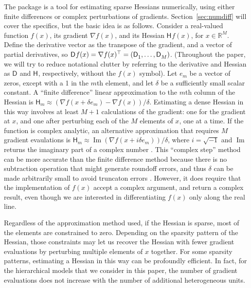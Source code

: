 \documentclass[jss]{jss}\usepackage[]{graphicx}\usepackage[]{color}
\newcommand{\parD}[3]{\mathsf{D}^{#1}_{#2}#3}
\newcommand{\hess}[2]{\mathsf{H}_{#1}#2}
\DeclareMathOperator{\Imag}{Im}
\begin{document}
The  package is a tool for estimating
sparse Hessians numerically, using either finite differences or
complex perturbations of
gradients.  Section~\ref{sec:numdiff} will
cover the specifics, but the basic idea is as follows.  Consider a real-valued
function $f(x)$, its gradient $\nabla{f(x)}$, and its Hessian
$\hess{}{f(x)}$, for $x\in\mathbb{R}^M$.  Define the derivative vector
as the transpose of the gradient, and a vector of partial derivatives, so
${\parD{}{}{f(x)}=\nabla f(x)^\top=\left(\parD{}{1}{},\mathellipsis,\parD{}{M}{}\right)}$.   (Throughout the paper, we will try
to reduce notational clutter by referring to the derivative and
Hessian as $\parD{}{}{}$ and $\hess{}{}$, respectively, without the
$f(x)$ symbol).  Let $e_m$ be a vector of zeros, except with a 1 in the $m$th
element, and let $\delta$ be a sufficiently small scalar
constant. A ``finite difference'' linear approximation to the $m$th column of the Hessian is ${\hess{m}{}\approx\left(\nabla f(x+\delta
  e_m)- \nabla f(x)\right)/\delta}$.  Estimating a dense Hessian in this way involves at least $M+1$ calculations of the
gradient: one for the gradient at $x$, and one after perturbing each
of the $M$ elements of $x$, one at a time. If the function is complex
analytic, an alternative approximation that requires $M$ gradient
evaulations is $\hess{m}{}\approx\Imag\left(\nabla f(x+i\delta
  e_m)\right)/\delta$, where $i=\sqrt{-1}$ and $\Imag$ returns the imaginary part of a complex
number \citep{SquireTrapp1998}. This ``complex step'' method can be more accurate than the
finite difference method because there is no subtraction operation
that might generate roundoff errors, and thus $\delta$ can be made
arbitrarily small to avoid truncaton errors \citep{LaiCrassidis2008}. However, it does require that the
implementation of $f(x)$ accept a complex argument, and return a
complex result, even though we are interested in differentiating $f(x)$ only along
the real line.

Regardless of the approximation method used, if the Hessian is sparse, most of the
elements are constrained to zero.  Depending
on the sparsity pattern of the Hessian, those constraints may let us recover
the Hessian with fewer gradient evaluations by perturbing multiple
elements of $x$ together.  For some sparsity patterns, estimating a Hessian in
this way can be profoundly efficient.  In fact, for the hierarchical models that we consider in
this paper, the number of gradient evaluations does not increase with
the number of additional heterogeneous units.
\end{document}
